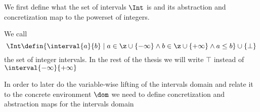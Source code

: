 We first define what the set of intervals \(\Int\) is and its
abstraction and concretization map to the powerset of integers.

\begin{definition}\label{def:int}
  We call
  \begin{equation*}
    \Int \defin \{ \interval{a}{b} \mid a \in \z \cup \{-\infty\}
    \wedge b \in \z \cup \{+\infty\} \wedge a\leq b \} \cup
    \{\bot\} 
  \end{equation*}
  the set of integer intervals. In the rest of the thesis we will
  write \(\top\) instead of \(\interval{-\infty}{+\infty}\)
\end{definition}

In order to later do the variable-wise lifting of the intervals domain
and relate it to the concrete environment \(\dom\) we need to define
concretization and abstraction maps for the intervals domain

